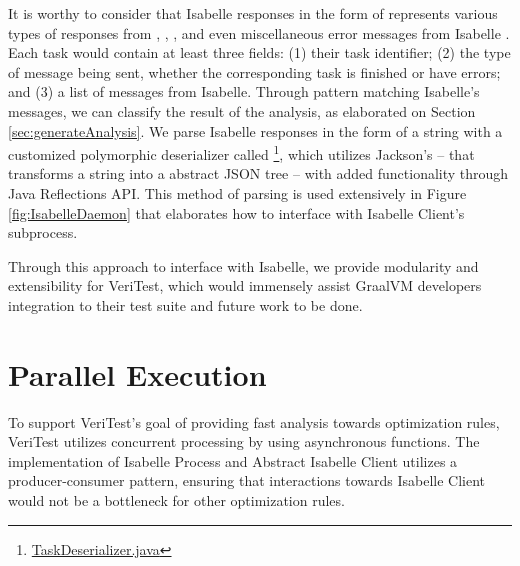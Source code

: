 It is worthy to consider that Isabelle responses in the form of  represents various types of responses from , 
, , and even miscellaneous error messages from Isabelle \cite[Sec. 4.4]{isabelleSystem}. 
Each task would contain at least three fields: (1) their task identifier; (2) the type of message being sent, whether the corresponding task 
is finished or have errors; and (3) a list of messages from Isabelle. Through pattern matching Isabelle's messages, we can classify the result 
of the analysis, as elaborated on Section \ref{sec:generateAnalysis}. We parse 
Isabelle responses in the form of a string with a customized polymorphic deserializer called \footnote{\href{https://github.com/achmadafriza/veritest-dev/blob/master/src/main/java/com/veriopt/veritest/isabelle/TaskDeserializer.java}{TaskDeserializer.java}}, 
which utilizes Jackson's  \cite{fasterxml_objectmapper_nodate} -- that transforms a string into a abstract JSON tree -- 
with added functionality through Java Reflections API. This method of parsing is used extensively in Figure \ref{fig:IsabelleDaemon} that 
elaborates how to interface with Isabelle Client's subprocess.

Through this approach to interface with Isabelle, we provide modularity and extensibility for VeriTest, which would immensely assist 
GraalVM developers integration to their test suite and future work to be done.

\section{Parallel Execution}
\label{sec:ParallelExecution}

To support VeriTest's goal of providing fast analysis towards optimization rules, VeriTest utilizes concurrent processing by using asynchronous 
functions. The implementation of Isabelle Process and Abstract Isabelle Client utilizes a producer-consumer pattern, ensuring 
that interactions towards Isabelle Client would not be a bottleneck for other optimization rules.


